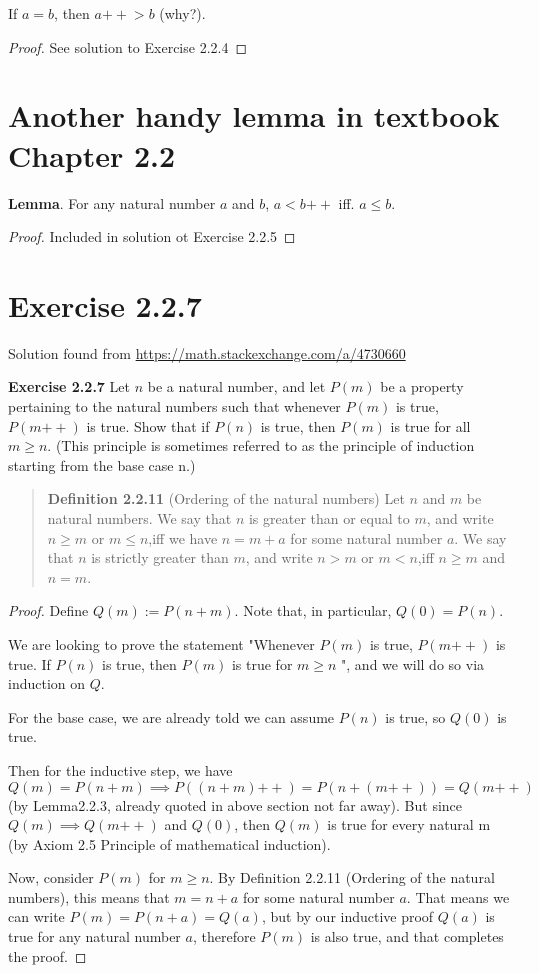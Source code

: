 \documentclass{article}
\newcommand{\doubleplus}{\mathbin{{+}{+}}}
\begin{document}
If $a = b$, then $a\doubleplus  > b$ (why?).

\begin{proof}
    See solution to Exercise 2.2.4
\end{proof}

\section{Another handy lemma in textbook Chapter 2.2}
\textbf{Lemma}. For any natural number $a$ and $b$, $a  <b\doubleplus$ iff. $a \le b$.
\begin{proof}
    Included in solution ot Exercise 2.2.5
\end{proof}

\section{Exercise 2.2.7}
Solution found from \url{https://math.stackexchange.com/a/4730660}

\textbf{Exercise 2.2.7} Let $n$ be a natural number,
and let $P(m)$ be a property pertaining to the natural numbers such that
whenever $P(m)$ is true, $P(m\doubleplus)$ is true.
Show that if $P(n)$ is true, then $P(m)$ is true for all $m \ge n$.
(This principle is sometimes referred to as the principle of induction starting from the base case n.)
\begin{quotation}
    \textbf{Definition 2.2.11} (Ordering of the natural numbers)
    Let $n$ and $m$ be natural numbers.
    We say that $n$ is greater than or equal to $m$, and write $n \ge m$ or $m \le n$,iff we
    have $n = m +a$ for some natural number $a$. We say that $n$ is strictly greater than $m$,
    and write $n > m$ or $m < n$,iff $n \ge m$ and $n= m$.

\end{quotation}

\begin{proof}
    Define $Q(m):=P(n+m)$. Note that, in particular, $Q(0)=P(n)$.

    We are looking to prove the statement "Whenever $P(m)$
    is true, $P(m\doubleplus )$ is true. If $P(n)$
    is true, then $P(m)$
    is true for $m\ge n$
    ", and we will do so via induction on $Q$.

    For the base case, we are already told we can assume $P(n)$
    is true, so $Q(0)$
    is true.

    Then for the inductive step,
    we have $Q(m)=P(n+m)\implies P((n+m)\doubleplus )=P(n+(m\doubleplus ))=Q(m\doubleplus )$
    (by  Lemma2.2.3, already quoted in above section not far away).
    But since $Q(m)\implies Q(m\doubleplus )$
    and $Q(0)$, then $Q(m)$ is true for every natural m
    (by Axiom 2.5 Principle of mathematical induction).

    Now, consider $P(m)$
    for $m\ge n$.
    By  Definition 2.2.11 (Ordering of the natural numbers), this means that $m=n+a$
    for some natural number $a$.
    That means we can write $P(m)=P(n+a)=Q(a)$,
    but by our inductive proof $Q(a)$ is true for any natural number $a$,
    therefore $P(m)$ is also true, and that completes the proof.
\end{proof}
\end{document}
